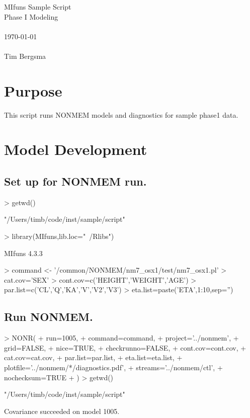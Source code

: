 
\usepackage{Sweave}

 

\vspace*{2cm}
\begin{center}
{\Large MIfuns Sample Script}\\
\vspace{1.5cm}
{\Large Phase I Modeling}\\
~\\
\today\\
~\\
Tim Bergsma\\
\end{center}
\newpage

\section{Purpose}
This script runs NONMEM models and diagnostics for sample phase1 data.
\section{Model Development}
\subsection{Set up for NONMEM run.}
\begin{Schunk}
\begin{Sinput}
> getwd()
\end{Sinput}
\begin{Soutput}
[1] "/Users/timb/code/inst/sample/script"
\end{Soutput}
\begin{Sinput}
> library(MIfuns,lib.loc="~/Rlibs")
\end{Sinput}
\begin{Soutput}
MIfuns 4.3.3 
\end{Soutput}
\begin{Sinput}
> command <- '/common/NONMEM/nm7_osx1/test/nm7_osx1.pl'
> cat.cov='SEX'
> cont.cov=c('HEIGHT','WEIGHT','AGE')
> par.list=c('CL','Q','KA','V','V2','V3')
> eta.list=paste('ETA',1:10,sep='')
\end{Sinput}
\end{Schunk}
\subsection{Run NONMEM.}
\begin{Schunk}
\begin{Sinput}
> NONR(
+      run=1005,
+      command=command,
+      project='../nonmem',
+      grid=FALSE,
+      nice=TRUE,
+      checkrunno=FALSE,
+      cont.cov=cont.cov,
+      cat.cov=cat.cov,
+      par.list=par.list,
+      eta.list=eta.list,
+      plotfile='../nonmem/*/diagnostics.pdf',
+      streams='../nonmem/ctl',
+      nochecksum=TRUE
+ )
> getwd()
\end{Sinput}
\begin{Soutput}
[1] "/Users/timb/code/inst/sample/script"
\end{Soutput}
\end{Schunk}
Covariance succeeded on model 1005.
